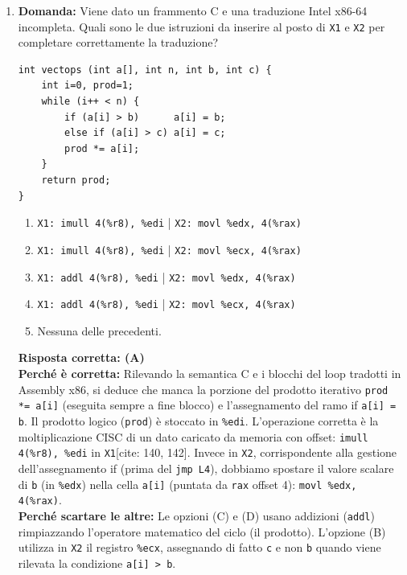 \documentclass[12pt, a4paper]{article}
\begin{document}
\begin{enumerate}
\newpage

    \item \textbf{Domanda:} Viene dato un frammento C e una traduzione Intel x86-64 incompleta. Quali sono le due istruzioni da inserire al posto di \texttt{X1} e \texttt{X2} per completare correttamente la traduzione?
\begin{verbatim}
int vectops (int a[], int n, int b, int c) {
    int i=0, prod=1;
    while (i++ < n) {
        if (a[i] > b)      a[i] = b;
        else if (a[i] > c) a[i] = c;
        prod *= a[i];
    }
    return prod;
}
\end{verbatim}
    \begin{enumerate}[label=(\Alph*)]
        \item \texttt{X1: imull 4(\%r8), \%edi} | \texttt{X2: movl \%edx, 4(\%rax)}
        \item \texttt{X1: imull 4(\%r8), \%edi} | \texttt{X2: movl \%ecx, 4(\%rax)}
        \item \texttt{X1: addl 4(\%r8), \%edi} | \texttt{X2: movl \%edx, 4(\%rax)}
        \item \texttt{X1: addl 4(\%r8), \%edi} | \texttt{X2: movl \%ecx, 4(\%rax)}
        \item Nessuna delle precedenti.
    \end{enumerate}
    \textbf{Risposta corretta: (A)} \\
    \textbf{Perché è corretta:} Rilevando la semantica C e i blocchi del loop tradotti in Assembly x86, si deduce che manca la porzione del prodotto iterativo \texttt{prod *= a[i]} (eseguita sempre a fine blocco) e l'assegnamento del ramo if \texttt{a[i] = b}. Il prodotto logico (\texttt{prod}) è stoccato in \texttt{\%edi}. L'operazione corretta è la moltiplicazione CISC di un dato caricato da memoria con offset: \texttt{imull 4(\%r8), \%edi} in \texttt{X1}[cite: 140, 142]. Invece in \texttt{X2}, corrispondente alla gestione dell'assegnamento if (prima del \texttt{jmp L4}), dobbiamo spostare il valore scalare di \texttt{b} (in \texttt{\%edx}) nella cella \texttt{a[i]} (puntata da \texttt{rax} offset 4): \texttt{movl \%edx, 4(\%rax)}. \\
    \textbf{Perché scartare le altre:} Le opzioni (C) e (D) usano addizioni (\texttt{addl}) rimpiazzando l'operatore matematico del ciclo (il prodotto). L'opzione (B) utilizza in \texttt{X2} il registro \texttt{\%ecx}, assegnando di fatto \texttt{c} e non \texttt{b} quando viene rilevata la condizione \texttt{a[i] > b}.

\end{enumerate}
\end{document}
